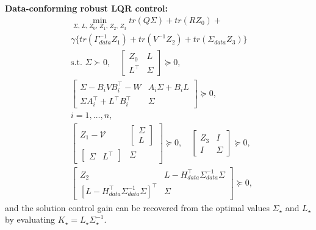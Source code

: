 \documentclass[letterpaper, 10 pt, conference]{ieeeconf}
\newcommand{\trace}{\textit{tr}}
\begin{document}
\vskip 2mm
\textbf{Data-conforming robust LQR control:}
\begin{equation} \label{eq:state-input-data-conforming Robust LQR problem}
    \begin{aligned}
         &\min_{\Sigma ,\,L,\,Z_0,\,Z_1,\,Z_2,\,Z_3} \trace \left (  Q\Sigma  \right ) + \trace \left ( R Z_0 \right) + \\
         &\gamma \Big \{ \trace \left ( \Gamma_{data}^{-1} Z_1 \right) + \trace \left ( V^{-1} Z_2 \right) + \trace \left ( \Sigma_{data} Z_3 \right) \Big \} \\
        &\text{s.t. } \Sigma \succ 0, \quad
        \begin{bmatrix}
            Z_0 & L\\
            L^\top & \Sigma 
        \end{bmatrix}\succeq 0,\\
        &\begin{bmatrix}
        \Sigma-B_i V B_i^\top-W & A_i \Sigma + B_i L \\
        \Sigma A_i^\top + L^\top B_i^\top & \Sigma
    \end{bmatrix} \succeq 0, \\
    &i=1,\hdots,n,\\
    &\begin{bmatrix}
        Z_1 - 
        \mathcal{V}
    & \begin{bmatrix}
        \Sigma\\
        L
    \end{bmatrix}\\
    \begin{bmatrix}
        \Sigma & L^\top
    \end{bmatrix} & \Sigma
\end{bmatrix} \succeq 0, \quad
\begin{bmatrix}
        Z_3 & I \\
    I & \Sigma
\end{bmatrix} \succeq 0, \\
&
\begin{bmatrix}
        Z_2 & L- H_{data}^\top \Sigma_{data}^{-1} \Sigma \\ 
        \left[L- H_{data}^\top \Sigma_{data}^{-1} \Sigma\right]^\top & \Sigma
    \end{bmatrix} \succeq 0,
    \end{aligned}
\end{equation}
and the solution control gain can be recovered from the optimal values $\Sigma_\star$ and $L_\star$ by evaluating $K_\star = L_\star \Sigma_\star^{-1}$.
\end{document}

